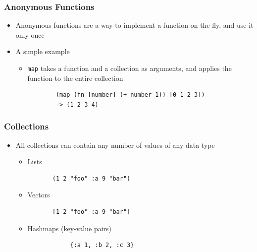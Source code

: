 \documentclass{beamer}
\begin{document}
\begin{frame}[fragile]
\frametitle{Anonymous Functions}
	\begin{itemize}
  	 \item Anonymous functions are a way to implement a function on the fly, and use it only once\
  	 \item A simple example
  	 \begin{itemize}
  	 	\item \texttt{map} takes a function and a collection as arguments, and applies the function to the entire collection
  	 	\begin{verbatim}
		(map (fn [number] (+ number 1)) [0 1 2 3])
		-> (1 2 3 4)
	\end{verbatim}
	\end{itemize}
	\end{itemize}
\end{frame}

\begin{frame}[fragile]
\frametitle{Collections}
    \begin{itemize}
     \item All collections can contain any number of values of any data type
	 \begin{itemize}
	  \item Lists
	  \begin{verbatim}
	   (1 2 "foo" :a 9 "bar")
	  \end{verbatim}
  	  \item Vectors
  	  \begin{verbatim}
	   [1 2 "foo" :a 9 "bar"]
	  \end{verbatim}
  	  \item Hashmaps (key-value pairs)
  	  \begin{verbatim}
	    	{:a 1, :b 2, :c 3}
	  \end{verbatim}
	 \end{itemize}
    \end{itemize}
\end{frame}
\end{document}
